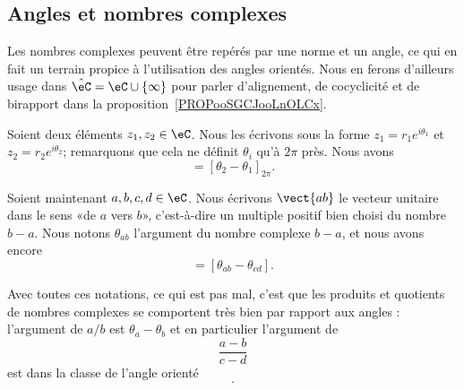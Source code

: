 \subsection{Angles et nombres complexes}
\label{SUBSECooKNUVooUBKaWm}

Les nombres complexes peuvent être repérés par une norme et un angle, ce qui en fait un terrain propice à l'utilisation des angles orientés. Nous en ferons d'ailleurs usage dans \( \hat\eC=\eC\cup\{ \infty \}\) pour parler d'alignement, de cocyclicité et de birapport dans la proposition~\ref{PROPooSGCJooLnOLCx}.

Soient deux éléments \( z_1,z_2\in \eC\). Nous les écrivons sous la forme \( z_1=r_1 e^{i\theta_1}\) et \( z_2=r_2 e^{i\theta_2}\); remarquons que cela ne définit \( \theta_i\) qu'à \( 2\pi\) près. Nous avons
\begin{equation}
	[z_1,z_2]=[\theta_2-\theta_1]_{2\pi}.
\end{equation}

Soient maintenant \( a,b,c,d\in \eC\). Nous écrivons \( \vect{ ab }\) le vecteur unitaire dans le sens «de \( a\) vers \( b\)», c'est-à-dire un multiple positif bien choisi du nombre \( b-a\). Nous notons \( \theta_{ab}\) l'argument du nombre complexe \( b-a\), et nous avons encore
\begin{equation}
	[\vect{ ab },\vect{ cd }]=[\theta_{ab}-\theta_{cd}].
\end{equation}

Avec toutes ces notations, ce qui est pas mal, c'est que les produits et quotients de nombres complexes se comportent très bien par rapport aux angles : l'argument de \( a/b\) est \( \theta_a-\theta_b\) et en particulier l'argument de
\begin{equation}
	\frac{ a-b }{ c-d }
\end{equation}
est dans la classe de l'angle orienté
\begin{equation}
	[\vect{ ba },\vect{ dc }].
\end{equation}

